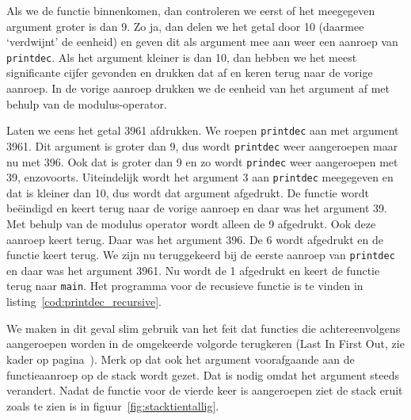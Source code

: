 Als we de functie binnenkomen, dan controleren we eerst of het meegegeven argument groter is dan 9. Zo ja, dan delen we het getal door 10 (daarmee `verdwijnt' de eenheid) en geven dit als argument mee aan weer een aanroep van \texttt{printdec}. Als het argument kleiner is dan 10, dan hebben we het meest significante cijfer gevonden en drukken dat af en keren terug naar de vorige aanroep. In de vorige aanroep drukken we de eenheid van het argument af met behulp van de modulus-operator.

Laten we eens het getal 3961 afdrukken. We roepen \texttt{printdec} aan met argument 3961. Dit argument is groter dan 9, dus wordt \texttt{printdec} weer aangeroepen maar nu met 396. Ook dat is groter dan 9 en zo wordt \texttt{prindec} weer aangeroepen met 39, enzovoorts. Uiteindelijk wordt het argument 3 aan \texttt{printdec} meegegeven en dat is kleiner dan 10, dus wordt dat argument afgedrukt. De functie wordt beëindigd en keert terug naar de vorige aanroep en daar was het argument 39. Met behulp van de modulus operator wordt alleen de 9 afgedrukt. Ook deze aanroep keert terug. Daar was het argument 396. De 6 wordt afgedrukt en de functie keert terug. We zijn nu teruggekeerd bij de eerste aanroep van \texttt{printdec} en daar was het argument 3961. Nu wordt de 1 afgedrukt en keert de functie terug naar \texttt{main}. Het programma voor de recusieve functie is te vinden in listing~\ref{cod:printdec_recursive}.


We maken in dit geval slim gebruik van het feit dat functies die achtereenvolgens aangeroepen worden in de omgekeerde volgorde terugkeren (Last In First Out, zie kader op pagina~\pageref{fig:stack}).
Merk op dat ook het argument voorafgaande aan de functieaanroep op de stack wordt gezet. Dat is nodig omdat het argument steeds verandert.
Nadat de functie voor de vierde keer is aangeroepen ziet de stack eruit zoals te zien is in figuur~\ref{fig:stacktientallig}.

